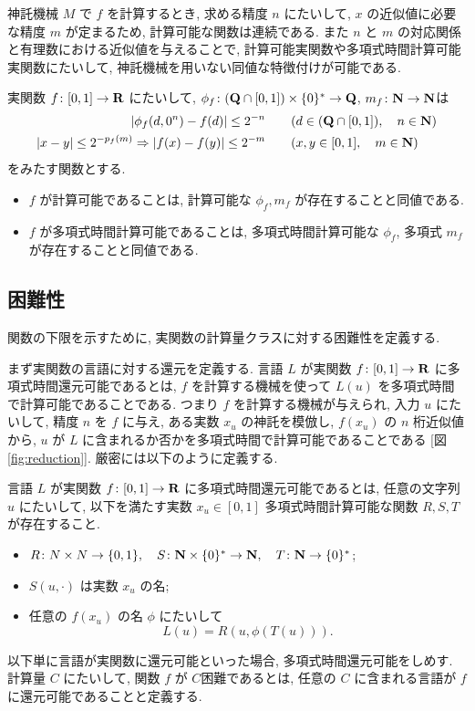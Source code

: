  神託機械 $M$ で $f$ を計算するとき, 求める精度 $n$ にたいして,
 $x$ の近似値に必要な精度 $m$ が定まるため,
 計算可能な関数は連続である.
 また $n$ と $m$ の対応関係と有理数における近似値を与えることで,
 計算可能実関数や多項式時間計算可能実関数にたいして,
 神託機械を用いない同値な特徴付けが可能である.

 \begin{lemma}
  \label{lem:type1representation}
  実関数 $f\colon [0,1] \to \mathbf R$ にたいして,
  $\phi_f\colon (\mathbf Q \cap [0, 1]) \times \{0\}^* \to \mathbf Q$, $m_f\colon \mathbf N \to \mathbf N$は
  \begin{align}
   |\phi_f(d, 0^n) - f(d)| \le 2^{-n} 
   &\qquad (d \in (\mathbf Q \cap [0,1]), \quad n \in \mathbf N)\\
   |x-y| \le 2^{-p_f(m)} \Rightarrow |f(x) - f(y)| \le 2^{-m}
   &\qquad (x, y \in [0, 1], \quad m \in \mathbf N)
  \end{align}
 をみたす関数とする.
  \begin{itemize}
   \item $f$ が計算可能であることは, 計算可能な $\phi_f, m_f$ が存在することと同値である. 
   \item $f$ が多項式時間計算可能であることは, 多項式時間計算可能な 
  $\phi_f$, 多項式 $m_f$ が存在することと同値である.
  \end{itemize} 
\end{lemma}

\subsection{困難性}

 関数の下限を示すために, 実関数の計算量クラスに対する困難性を定義する.

 まず実関数の言語に対する還元を定義する.
 言語 $L$ が実関数 $f\colon [0,1] \to \mathbf R$ に多項式時間還元可能であるとは,
 $f$ を計算する機械を使って $L(u)$ を多項式時間で計算可能であることである.
 つまり $f$ を計算する機械が与えられ, 入力 $u$ にたいして,
 精度 $n$ を $f$ に与え, ある実数 $x_u$ の神託を模倣し, $f(x_u)$ の $n$ 桁近似値から,
 $u$ が $L$ に含まれるか否かを多項式時間で計算可能であることである
 [図 \ref{fig:reduction}].
 厳密には以下のように定義する.

 \begin{definition}[多項式時間還元可能]
  言語 $L$ が実関数 $f\colon [0,1] \to \mathbf R$ に多項式時間還元可能であるとは, 
  任意の文字列 $u$ にたいして, 以下を満たす実数 $x_u \in [0,1]$
  多項式時間計算可能な関数 $R,S,T$ が存在すること.
  \begin{itemize}
   \item $R\colon N \times N \to \{0,1\}, \quad S\colon \mathbf N\times \{0\}^* \to \mathbf N, \quad
  T\colon \mathbf N \to \{0\}^*$;
   \item $S(u, \cdot)$ は実数 $x_u$ の名;
   \item 任意の $f(x_u)$ の名 $\phi$ にたいして
	 \[
	  L(u) = R(u, \phi(T(u))).
	 \]
  \end{itemize}
 \end{definition}
 以下単に言語が実関数に還元可能といった場合, 多項式時間還元可能をしめす.
 計算量 $C$ にたいして, 関数 $f$ が $C$困難であるとは,
 任意の $C$ に含まれる言語が $f$ に還元可能であることと定義する.

